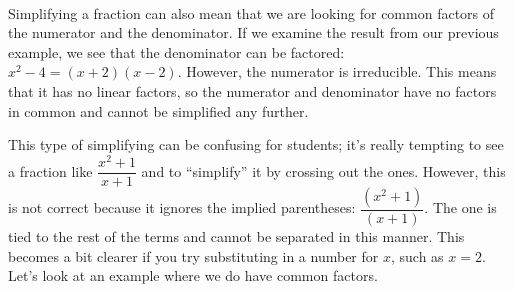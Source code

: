 \\



Simplifying a fraction can also mean that we are looking for common factors of the numerator and the denominator. If we examine the result from our previous example, we see that the denominator can be factored: $x^2-4=(x+2)(x-2)$. However, the numerator is irreducible. This means that it has no linear factors, so the numerator and denominator have no factors in common and cannot be simplified any further.

This type of simplifying can be confusing for students; it's really tempting to see a fraction like $\dfrac{x^2+1}{x+1}$ and to ``simplify'' it by crossing out the ones. However, this is not correct because it ignores the implied parentheses: $\dfrac{(x^2+1)}{(x+1)}$. The one is tied to the rest of the terms and cannot be separated in this manner. This becomes a bit clearer if you try substituting in a number for $x$, such as $x=2$. Let's look at an example where we do have common factors.

